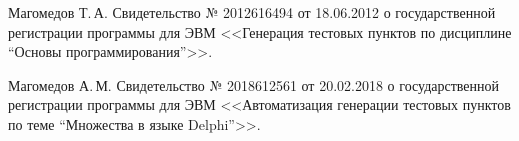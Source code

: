 \begin{thebibliography}{111}
Магомедов Т.\,А. Свидетельство № 2012616494 от 18.06.2012 о государственной регистрации программы для ЭВМ <<Генерация тестовых пунктов по дисциплине “Основы программирования”>>.

 Магомедов А.\,М. Свидетельство № 2018612561 от 20.02.2018 о государственной регистрации программы для ЭВМ <<Автоматизация генерации тестовых пунктов по теме “Множества в языке Delphi”>>.
















\end{thebibliography}
